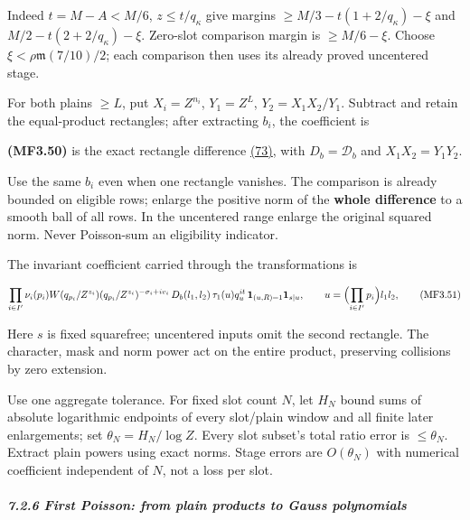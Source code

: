Indeed \(t=M-A<M/6\), \(z\le t/q_\kappa\) give margins \(\ge M/3-t(1+2/q_\kappa)-\xi\) and \(M/2-t(2+2/q_\kappa)-\xi\). Zero-slot comparison margin is \(\ge M/6-\xi\). Choose \(\xi<\rho\mathfrak m(7/10)/2\); each comparison then uses its already proved uncentered stage.

For both plains \(\ge L\), put \(X_i=Z^{n_i}\), \(Y_1=Z^L\), \(Y_2=X_1X_2/Y_1\). Subtract and retain the equal-product rectangles; after extracting \(b_i\), the coefficient is

\hypertarget{mf:eq:B3.50}{}

\label{mf:eq:B3.50}

\textbf{(MF3.50)} is the exact rectangle difference \protect\hyperlink{cf:eq:D.9}{(73)}, with \(D_b=\mathcal D_b\) and \(X_1X_2=Y_1Y_2\).

Use the same \(b_i\) even when one rectangle vanishes. The comparison is already bounded on eligible rows; enlarge the positive norm of the \textbf{whole difference} to a smooth ball of all rows. In the uncentered range enlarge the original squared norm. Never Poisson-sum an eligibility indicator.

The invariant coefficient carried through the transformations is

\hypertarget{mf:eq:B3.51}{}

\label{mf:eq:B3.51}

\[
\prod_{i\in I'}\nu_i(p_i)W(q_{p_i}/Z^{z_i})(q_{p_i}/Z^{z_i})^{-\sigma_i+iv_i}\,
D_b(l_1,l_2)\,\tau_1(u)q_u^{it}\,\mathbf1_{(u,R)=1}\mathbf1_{s\mid u},
\qquad u=\Bigl(\prod_{i\in I'}p_i\Bigr)l_1l_2,
\qquad\text{(MF3.51)}
\]

Here \(s\) is fixed squarefree; uncentered inputs omit the second rectangle. The character, mask and norm power act on the entire product, preserving collisions by zero extension.

Use one aggregate tolerance. For fixed slot count \(N\), let \(H_N\) bound sums of absolute logarithmic endpoints of every slot/plain window and all finite later enlargements; set \(\theta_N=H_N/\log Z\). Every slot subset's total ratio error is \(\le\theta_N\). Extract plain powers using exact norms. Stage errors are \(O(\theta_N)\) with numerical coefficient independent of \(N\), not a loss per slot.

\hypertarget{first-poisson-from-plain-products-to-gauss-polynomials}{}

\label{first-poisson-from-plain-products-to-gauss-polynomials}

\hypertarget{first-poisson-from-plain-products-to-gauss-polynomials-heading-2}{%
\subparagraph{7.2.6 First Poisson: from plain products to Gauss polynomials}}

